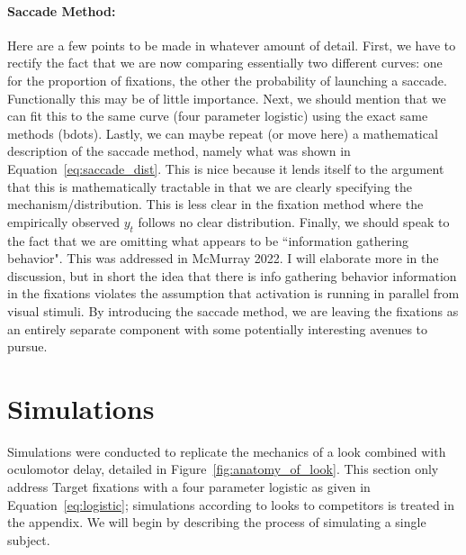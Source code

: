 \documentclass{article}
\begin{document}
\paragraph{Saccade Method:} Here are a few points to be made in whatever amount of detail. First, we have to rectify the fact that we are now comparing essentially two different curves: one for the proportion of fixations, the other the probability of launching a saccade. Functionally this may be of little importance. Next, we should mention that we can fit this to the same curve (four parameter logistic) using the exact same methods (bdots). Lastly, we can maybe repeat (or move here) a mathematical description of the saccade method, namely what was shown in Equation~\ref{eq:saccade_dist}. This is nice because it lends itself to the argument that this is mathematically tractable in that we are clearly specifying the mechanism/distribution. This is less clear in the fixation method where the empirically observed $y_t$ follows no clear distribution. Finally, we should speak to the fact that we are omitting what appears to be ``information gathering behavior". This was addressed in McMurray 2022. I will elaborate more in the discussion, but in short the idea that there is info gathering behavior information in the fixations violates the assumption that activation is running in parallel from visual stimuli. By introducing the saccade method, we are leaving the fixations as an entirely separate component with some potentially interesting avenues to pursue.

\section{Simulations}

Simulations were conducted to replicate the mechanics of a look combined with oculomotor delay, detailed in Figure~\ref{fig:anatomy_of_look}. This section only address Target fixations with a four parameter logistic as given in Equation~\ref{eq:logistic}; simulations according to looks to competitors is treated in the appendix. We will begin by describing the process of simulating a single subject.
\end{document}
